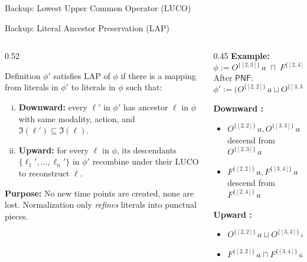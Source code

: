 \documentclass[9pt,aspectratio=169]{beamer}
\newcommand{\is}{\ensuremath{\mathfrak{I}}}
\newcommand{\pnf}{\ensuremath{\mathsf{PNF}}}
\newcommand{\dnf}{\ensuremath{\mathsf{DNF}}}
\newcommand{\LUCO}{\ensuremath{\mathrm{LUCO}}\xspace}
\newcommand{\LAP}{\ensuremath{\mathrm{LAP}}\xspace}
\newcommand{\ob}[2]{\ensuremath{O^{#1}\,#2}}
\newcommand{\forbb}[2]{\ensuremath{F^{#1}\,#2}}
\begin{document}
\begin{frame}{Backup: Lowest Upper Common Operator (\LUCO)}
\vspace{3mm}
\centering
{}
\end{frame}

\begin{frame}{Backup: Literal Ancestor Preservation (\LAP)}
\small
\begin{columns}[T]
\begin{column}{0.52\textwidth}
  \begin{block}{Definition}
    $\phi'$ satisfies \LAP of $\phi$ if there is a mapping from literals in $\phi'$ to literals in $\phi$ such that:
    \begin{enumerate}[(i)]
      \item \textbf{Downward:} every $\ell'$ in $\phi'$ has ancestor $\ell$ in $\phi$ with same modality, action, and $\is(\ell') \subseteq \is(\ell)$.
      \item \textbf{Upward:} for every $\ell$ in $\phi$, its descendants $\{\ell_1',\dots,\ell_n'\}$ in $\phi'$ recombine under their \LUCO to reconstruct $\ell$.
    \end{enumerate}
  \end{block}
  \medskip
  \textbf{Purpose:} No new time points are created, none are lost. Normalization only \emph{refines} literals into punctual pieces.
\end{column}
\begin{column}{0.45\textwidth}
  \textbf{Example:}
  \[
  \phi := \ob{\{[2,3]\}}{a} \;\sqcap\; \forbb{\{[2,4]\}}{a}
  \]
  After $\pnf$:
  \[
  \phi' := \big(\ob{\{[2,2]\}}{a} \sqcup \ob{\{[3,3]\}}{a}\big) \sqcap \forbb{\{[2,2]\}}{a} \sqcap \forbb{\{[3,4]\}}{a}
  \]

  \footnotesize
  \textbf{Downward \checkmark:}
  \begin{itemize}\setlength\itemsep{1pt}
    \item $\ob{\{[2,2]\}}{a}, \ob{\{[3,3]\}}{a}$ descend from $\ob{\{[2,3]\}}{a}$
    \item $\forbb{\{[2,2]\}}{a}, \forbb{\{[3,4]\}}{a}$ descend from $\forbb{\{[2,4]\}}{a}$
  \end{itemize}
  \textbf{Upward \checkmark:}
  \begin{itemize}\setlength\itemsep{1pt}
    \item $\ob{\{[2,2]\}}{a} \sqcup \ob{\{[3,3]\}}{a} \equiv \ob{\{[2,3]\}}{a}$
    \item $\forbb{\{[2,2]\}}{a} \sqcap \forbb{\{[3,4]\}}{a} \equiv \forbb{\{[2,4]\}}{a}$
  \end{itemize}
\end{column}
\end{columns}


\end{frame}
\end{document}
